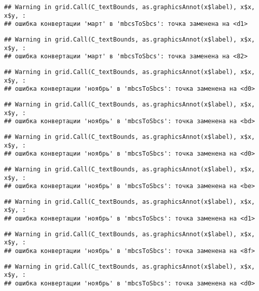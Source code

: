 \documentclass[
]{article}
\begin{document}
\begin{verbatim}
## Warning in grid.Call(C_textBounds, as.graphicsAnnot(x$label), x$x, x$y, :
## ошибка конвертации 'март' в 'mbcsToSbcs': точка заменена на <d1>
\end{verbatim}

\begin{verbatim}
## Warning in grid.Call(C_textBounds, as.graphicsAnnot(x$label), x$x, x$y, :
## ошибка конвертации 'март' в 'mbcsToSbcs': точка заменена на <82>
\end{verbatim}

\begin{verbatim}
## Warning in grid.Call(C_textBounds, as.graphicsAnnot(x$label), x$x, x$y, :
## ошибка конвертации 'ноябрь' в 'mbcsToSbcs': точка заменена на <d0>
\end{verbatim}

\begin{verbatim}
## Warning in grid.Call(C_textBounds, as.graphicsAnnot(x$label), x$x, x$y, :
## ошибка конвертации 'ноябрь' в 'mbcsToSbcs': точка заменена на <bd>
\end{verbatim}

\begin{verbatim}
## Warning in grid.Call(C_textBounds, as.graphicsAnnot(x$label), x$x, x$y, :
## ошибка конвертации 'ноябрь' в 'mbcsToSbcs': точка заменена на <d0>
\end{verbatim}

\begin{verbatim}
## Warning in grid.Call(C_textBounds, as.graphicsAnnot(x$label), x$x, x$y, :
## ошибка конвертации 'ноябрь' в 'mbcsToSbcs': точка заменена на <be>
\end{verbatim}

\begin{verbatim}
## Warning in grid.Call(C_textBounds, as.graphicsAnnot(x$label), x$x, x$y, :
## ошибка конвертации 'ноябрь' в 'mbcsToSbcs': точка заменена на <d1>
\end{verbatim}

\begin{verbatim}
## Warning in grid.Call(C_textBounds, as.graphicsAnnot(x$label), x$x, x$y, :
## ошибка конвертации 'ноябрь' в 'mbcsToSbcs': точка заменена на <8f>
\end{verbatim}

\begin{verbatim}
## Warning in grid.Call(C_textBounds, as.graphicsAnnot(x$label), x$x, x$y, :
## ошибка конвертации 'ноябрь' в 'mbcsToSbcs': точка заменена на <d0>
\end{verbatim}
\end{document}
